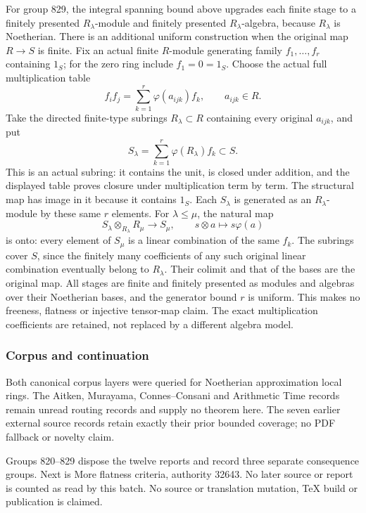 For group 829, the integral spanning bound above upgrades each finite stage to a finitely presented \(R_\lambda\)-module and finitely presented \(R_\lambda\)-algebra, because \(R_\lambda\) is Noetherian. There is an additional uniform construction when the original map \(R\to S\) is finite. Fix an actual finite \(R\)-module generating family \(f_1,\ldots,f_r\) containing \(1_S\); for the zero ring include \(f_1=0=1_S\). Choose the actual full multiplication table \[
f_if_j=\sum_{k=1}^r\varphi(a_{ijk})f_k,\qquad a_{ijk}\in R.
\] Take the directed finite-type subrings \(R_\lambda\subset R\) containing every original \(a_{ijk}\), and put \[
S_\lambda=\sum_{k=1}^r\varphi(R_\lambda)f_k\subset S.
\] This is an actual subring: it contains the unit, is closed under addition, and the displayed table proves closure under multiplication term by term. The structural map has image in it because it contains \(1_S\). Each \(S_\lambda\) is generated as an \(R_\lambda\)-module by these same \(r\) elements. For \(\lambda\le\mu\), the natural map \[
S_\lambda\otimes_{R_\lambda}R_\mu\to S_\mu,\qquad s\otimes a\mapsto s\varphi(a)
\] is onto: every element of \(S_\mu\) is a linear combination of the same \(f_k\). The subrings cover \(S\), since the finitely many coefficients of any such original linear combination eventually belong to \(R_\lambda\). Their colimit and that of the bases are the original map. All stages are finite and finitely presented as modules and algebras over their Noetherian bases, and the generator bound \(r\) is uniform. This makes no freeness, flatness or injective tensor-map claim. The exact multiplication coefficients are retained, not replaced by a different algebra model.

\subsubsection{Corpus and continuation}\label{algebra-proof-037-corpus-and-continuation}

Both canonical corpus layers were queried for Noetherian approximation local rings. The Aitken, Murayama, Connes--Consani and Arithmetic Time records remain unread routing records and supply no theorem here. The seven earlier external source records retain exactly their prior bounded coverage; no PDF fallback or novelty claim.

Groups 820--829 dispose the twelve reports and record three separate consequence groups. Next is More flatness criteria, authority 32643. No later source or report is counted as read by this batch. No source or translation mutation, TeX build or publication is claimed.
